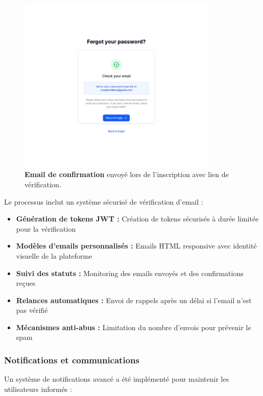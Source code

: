 \begin{figure}[H]
  \centering
  \includegraphics[width=0.85\textwidth,keepaspectratio]{old-reports/week_4_img/sended.jpeg}
  \caption{\textbf{Email de confirmation} envoyé lors de l'inscription avec lien de vérification.}
  \label{fig:confirmation_email}
\end{figure}

Le processus inclut un système sécurisé de vérification d'email :
\begin{itemize}
  \item \textbf{Génération de tokens JWT :} Création de tokens sécurisés à durée limitée pour la vérification
  \item \textbf{Modèles d'emails personnalisés :} Emails HTML responsive avec identité visuelle de la plateforme
  \item \textbf{Suivi des statuts :} Monitoring des emails envoyés et des confirmations reçues
  \item \textbf{Relances automatiques :} Envoi de rappels après un délai si l'email n'est pas vérifié
  \item \textbf{Mécanismes anti-abus :} Limitation du nombre d'envois pour prévenir le spam
\end{itemize}

\subsubsection{Notifications et communications}

Un système de notifications avancé a été implémenté pour maintenir les utilisateurs informés :

